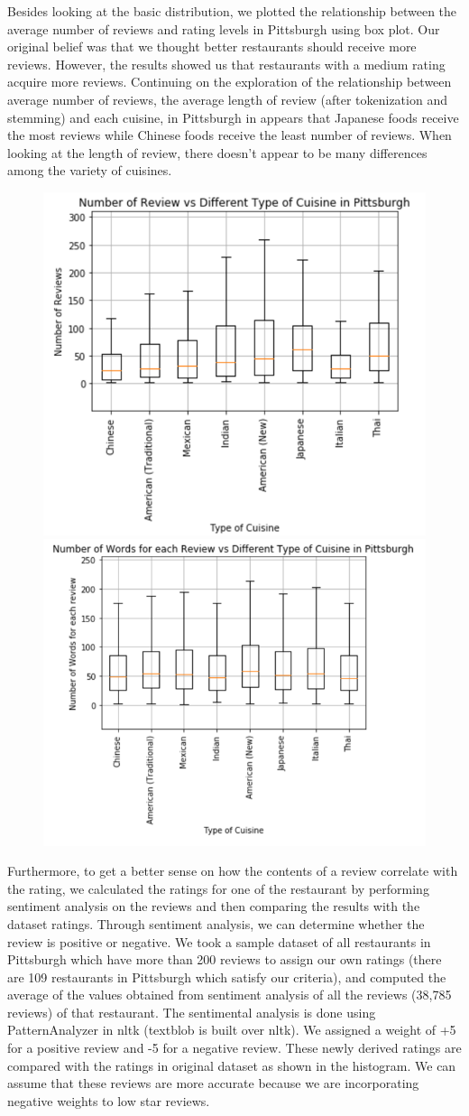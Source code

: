 \documentclass{neu_handout}
\begin{document}
Besides looking at the basic distribution, we plotted the relationship between the average number of reviews and rating levels in Pittsburgh using box plot. Our original belief was that we thought better restaurants should receive more reviews. However, the results showed us that restaurants with a medium rating acquire more reviews. Continuing on the exploration of the relationship between average number of reviews, the average length of review (after tokenization and stemming) and each cuisine, in Pittsburgh in appears that Japanese foods receive the most reviews while Chinese foods receive the least number of reviews. When looking at the length of review, there doesn't appear to be many differences among the variety of cuisines. 

\begin{figure}[h]
\centering
{
\includegraphics[width=0.35\linewidth]{number_of_review_vs_cuisine}
}
{
\includegraphics[width=0.4\linewidth]{average_review_length}
}
\end{figure}


Furthermore, to get a better sense on how the contents of a review correlate with the rating, we calculated the ratings for one of the restaurant by performing sentiment analysis on the reviews and then comparing the results with the dataset ratings. Through sentiment analysis, we can determine whether the review is positive or negative. We took a sample dataset of all restaurants in Pittsburgh which have more than 200 reviews to assign our own ratings (there are 109 restaurants in Pittsburgh which satisfy our criteria), and computed the average of the values obtained from sentiment analysis of all the reviews (38,785 reviews) of that restaurant. The sentimental analysis is done using PatternAnalyzer in nltk (textblob is built over nltk). We assigned a weight of +5 for a positive review and -5 for a negative review. These newly derived ratings are compared with the ratings in original dataset as shown in the histogram. We can assume that these reviews are more accurate because we are incorporating negative weights to low star reviews.
\end{document}
